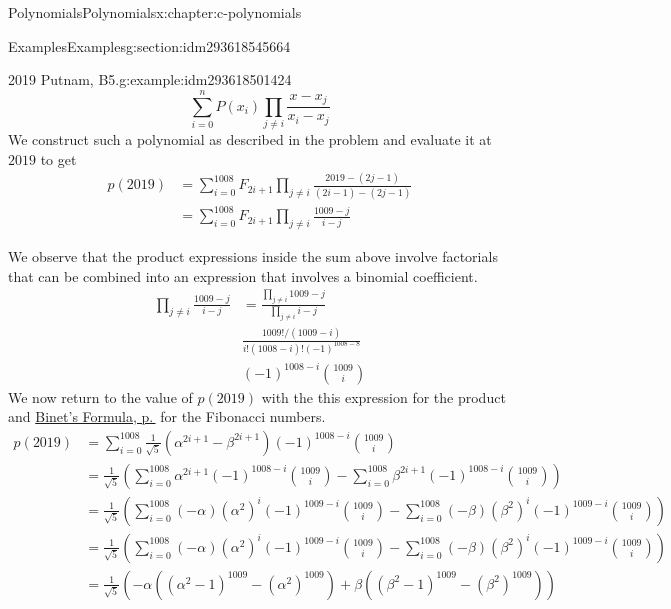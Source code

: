 \documentclass[twoside,10pt,]{book}
\numberwithin{equation}{section}
\begin{document}
\begin{chapterptx}{Polynomials}{}{Polynomials}{}{}{x:chapter:c-polynomials}
\begin{sectionptx}{Examples}{}{Examples}{}{}{g:section:idm293618545664}
\begin{example}{2019 Putnam, B5.}{g:example:idm293618501424}
\begin{equation*}
\sum_{i=0}^n P(x_i) \prod_{j \neq i} \frac{x-x_j}{x_i-x_j}
\end{equation*}
We construct such a polynomial as described in the problem and evaluate it at \(2019\) to get%
\begin{equation*}
\begin{split}
p(2019) &=\sum_{i=0}^{1008} F_{2i+1} \prod_{j \neq i} \frac{2019-(2j-1)}{(2i-1)-(2j-1)}\\
&=\sum_{i=0}^{1008} F_{2i+1} \prod_{j \neq i} \frac{1009-j}{i-j}
\end{split}
\end{equation*}
%
\par
We observe that the product expressions inside the sum above involve factorials that can be combined into an expression that involves a binomial coefficient.%
\begin{equation*}
\begin{split}
\prod_{j \neq i} \frac{1009-j}{i-j}&=\frac{\prod_{j \neq i} {1009-j}}
{\prod_{j \neq i} {i-j}}\\
&\frac{1009!/(1009-i)}{i! (1008-i)! (-1)^{1008-8}}\\
& (-1)^{1008-i}\binom{1009}{i}
\end{split}
\end{equation*}
We now return to the value of \(p(2019)\) with the this expression for the product and \hyperlink{x:exercise:binet}{Binet's Formula, p.\,\pageref{x:exercise:binet}} for the Fibonacci numbers.%
\begin{equation*}
\begin{split}
p(2019) &=\sum_{i=0}^{1008} \frac{1}{\sqrt{5}}(\alpha^{2i+1}-\beta^{2i+1}) 
(-1)^{1008-i}\binom{1009}{i}    \\
&=\frac{1}{\sqrt{5}}\left(    
\sum_{i=0}^{1008} \alpha^{2i+1}
(-1)^{1008-i}\binom{1009}{i}-
\sum_{i=0}^{1008} \beta^{2i+1}
(-1)^{1008-i}\binom{1009}{i}
\right)\\
&=\frac{1}{\sqrt{5}}\left(    
\sum_{i=0}^{1008}(-\alpha) (\alpha^2)^i
(-1)^{1009-i}\binom{1009}{i}-
\sum_{i=0}^{1008}(-\beta) (\beta^2)^i
(-1)^{1009-i}\binom{1009}{i}
\right)\\
&=\frac{1}{\sqrt{5}}\left(    
\sum_{i=0}^{1008}(-\alpha) (\alpha^2)^i
(-1)^{1009-i}\binom{1009}{i}-
\sum_{i=0}^{1008}(-\beta) (\beta^2)^i
(-1)^{1009-i}\binom{1009}{i}
\right)\\
&=\frac{1}{\sqrt{5}}\left(-\alpha((\alpha^2-1)^{1009} -(\alpha^2)^{1009} )
+\beta  ((\beta^2-1)^{1009} -(\beta^2)^{1009} )
\right)\\

\end{split}
\end{equation*}
\end{example}
\end{sectionptx}
\end{chapterptx}
\end{document}
